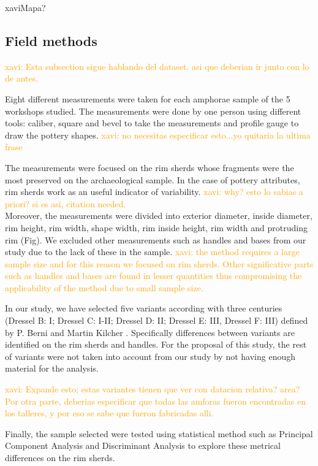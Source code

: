 \documentclass[review]{elsarticle}
\newcommand{\memo}[2]{\textcolor{#1}{#2}}
\newcommand{\xavi}[1]{\memo{orange}{xavi: #1\\}}
\begin{document}
xavi{Mapa?}

\subsection{Field methods}

\xavi{Esta subsection sigue hablando del dataset, asi que deberian ir junto con lo de antes.}

Eight different measurements were taken for each amphorae sample of the 5 workshops studied. The measurements were done by one person using different tools: caliber, square and bevel to take the measurements and profile gauge to draw the pottery shapes. \xavi{no necesitas especificar esto...yo quitaria la ultima frase}

The measurements were focused on the rim sherds whose fragments were the most preserved on the archaeological sample. In the case of pottery attributes, rim sherds work as an useful indicator of variability. \xavi{why? esto lo sabias a priori? si es asi, citation needed.} Moreover, the measurements were divided into exterior diameter, inside diameter, rim height, rim width, shape width, rim inside height, rim width and protruding rim (Fig). We excluded other measurements such as handles and bases from our study due to the lack of these in the sample. \xavi{the method requires a large sample size and for this reason we focused on rim sherds. Other significative parts such as handles and bases are found in lesser quantities thus compromising the applicability of the method due to small sample size.}

In our study, we have selected five variants according with three centuries
(Dressel B: I; Dressel C: I-II; Dressel D: II; Dressel E: III, Dressel F: III) defined by P. Berni \citep{berni_millet_epigrafianforica_2008} and Martin Kilcher \citep{martin-kilcher_romischen_1994}. Specifically differences between variants are identified on the rim sherds and handles. For the proposal of this study, the rest of variants were not taken into account from our study by not having enough material for the analysis. 

\xavi{Expande esto; estas variantes tienen que ver con datacion relativa? area? Por otra parte, deberias especificar que todas las amforas fueron encontradas en los talleres, y por eso se sabe que fueron fabricadas alli.}

Finally, the sample selected were tested using statistical method such as Principal Component Analysis and Discriminant Analysis to explore these metrical differences on the rim sherds. 
\end{document}
